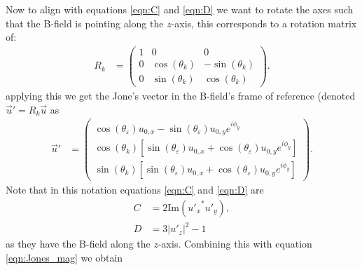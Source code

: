 	Now to align with equations \ref{eqn:C} and \ref{eqn:D} we want to rotate the axes such that the B-field is pointing along the \(z\)-axis, this corresponds to a rotation matrix of:
	\begin{align}
	    R_k &= \begin{pmatrix}
	 1& 0 & 0 \\
	 0 & \cos(\theta_k) & -\sin(\theta_k) \\
	 0 & \sin(\theta_k) & \cos(\theta_k)
	\end{pmatrix}.
	\end{align}
	applying this we get the Jone's vector in the B-field's frame of reference (denoted \(\vec{u}'= R_k \vec{u}\) as
	\begin{align}
	    \vec{u}' &= \begin{pmatrix}
	    \cos(\theta_\varepsilon) u_{0,x} -\sin(\theta_\varepsilon) u_{0,y} e^{i \phi_y}\\
	    \cos(\theta_k) \left[\sin(\theta_\varepsilon) u_{0,x} +\cos(\theta_\varepsilon) u_{0,y} e^{i \phi_y}\right] \\
	    \sin(\theta_k) \left[\sin(\theta_\varepsilon) u_{0,x} +\cos(\theta_\varepsilon) u_{0,y} e^{i \phi_y}\right] 
	\end{pmatrix}.\label{eqn:Jones_mag}
	\end{align}
	Note that in this notation equations \ref{eqn:C} and \ref{eqn:D} are
	\begin{align}
	    C &= 2 \text{Im}({u'_x}^* u'_y),\\
	    D &= 3|u'_z|^2 -1
	\end{align}
	as they have the B-field along the \(z\)-axis. Combining this with equation \ref{eqn:Jones_mag} we obtain
